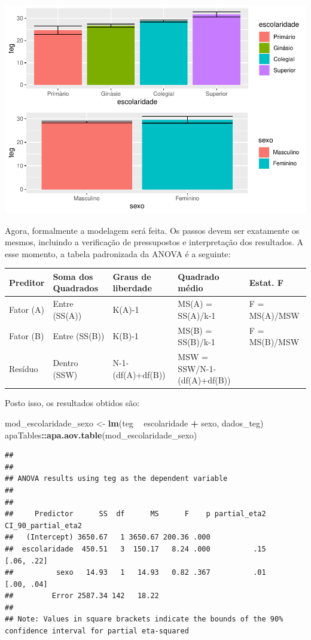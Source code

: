 \documentclass[
]{book}
\newenvironment{Shaded}{\begin{snugshade}}{\end{snugshade}}
\newcommand{\KeywordTok}[1]{\textcolor[rgb]{0.13,0.29,0.53}{\textbf{#1}}}
\newcommand{\NormalTok}[1]{#1}
\newcommand{\OperatorTok}[1]{\textcolor[rgb]{0.81,0.36,0.00}{\textbf{#1}}}
\newcommand{\StringTok}[1]{\textcolor[rgb]{0.31,0.60,0.02}{#1}}
\begin{document}
\begin{center}\includegraphics{gitbook-demo_files/figure-latex/unnamed-chunk-66-1} \end{center}

Agora, formalmente a modelagem será feita. Os passos devem ser exatamente os mesmos, incluindo a verificação de pressupostos e interpretação dos resultados. A esse momento, a tabela padronizada da ANOVA é a seguinte:

\begin{longtable}[]{@{}lllll@{}}
\toprule
Preditor & Soma dos Quadrados & Graus de liberdade & Quadrado médio & Estat. F\tabularnewline
\midrule
\endhead
Fator (A) & Entre (SS(A)) & K(A)-1 & MS(A) = SS(A)/k-1 & F = MS(A)/MSW\tabularnewline
Fator (B) & Entre (SS(B)) & K(B)-1 & MS(B) = SS(B)/k-1 & F = MS(B)/MSW\tabularnewline
Resíduo & Dentro (SSW) & N-1-(df(A)+df(B)) & MSW = SSW/N-1-(df(A)+df(B)) &\tabularnewline
\bottomrule
\end{longtable}

Posto isso, os resultados obtidos são:

\begin{Shaded}
\begin{Highlighting}[]
\NormalTok{mod_escolaridade_sexo <-}\StringTok{ }\KeywordTok{lm}\NormalTok{(teg }\OperatorTok{~}\StringTok{ }\NormalTok{escolaridade }\OperatorTok{+}\StringTok{ }\NormalTok{sexo, dados_teg)}
\NormalTok{apaTables}\OperatorTok{::}\KeywordTok{apa.aov.table}\NormalTok{(mod_escolaridade_sexo)}
\end{Highlighting}
\end{Shaded}

\begin{verbatim}
## 
## 
## ANOVA results using teg as the dependent variable
##  
## 
##     Predictor      SS  df      MS      F    p partial_eta2 CI_90_partial_eta2
##   (Intercept) 3650.67   1 3650.67 200.36 .000                                
##  escolaridade  450.51   3  150.17   8.24 .000          .15         [.06, .22]
##          sexo   14.93   1   14.93   0.82 .367          .01         [.00, .04]
##         Error 2587.34 142   18.22                                            
## 
## Note: Values in square brackets indicate the bounds of the 90% confidence interval for partial eta-squared
\end{verbatim}
\end{document}
